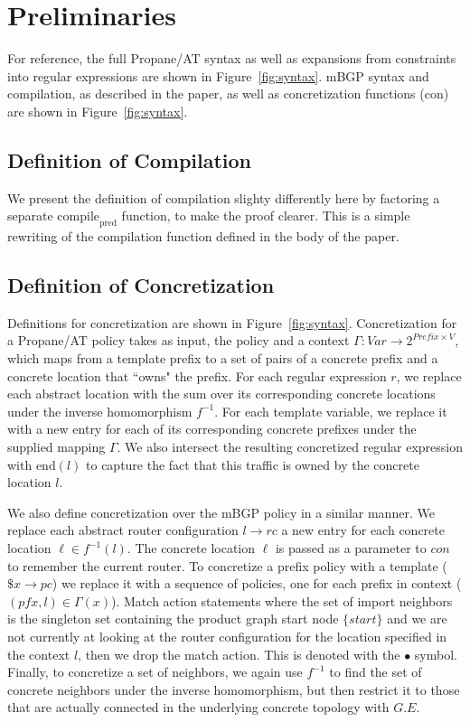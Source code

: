 \documentclass[twocolumn, openany]{sig-alternate-10pt}
\newcommand{\sysname}{{\small \sf Propane/AT}\xspace}
\newcommand{\Con}{\mathrm{con}}
\newcommand{\CompilePred}{\ensuremath{\mathrm{compile}_\mathrm{pred}}}
\begin{document}
\section{Preliminaries}

For reference, the full \sysname syntax as well as expansions from constraints into regular expressions are shown in Figure~\ref{fig:syntax}. mBGP syntax and compilation, as described in the paper, as well as concretization functions ($\Con$) are shown in Figure~\ref{fig:syntax}.

\subsection{Definition of Compilation}

We present the definition of compilation slighty differently here by factoring a separate $\CompilePred$ function, to make the proof clearer. This is a simple rewriting of the compilation function defined in the body of the paper.

\subsection{Definition of Concretization}

Definitions for concretization are shown in Figure~\ref{fig:syntax}. Concretization for a \sysname policy takes as input, the policy and a context
$\Gamma : Var \rightarrow 2^{Prefix \times V}$,
which maps from a template prefix to a set of pairs of a concrete prefix and a concrete location that ``owns" the prefix.
%
For each regular expression $r$, we replace each abstract location with the sum over its corresponding concrete locations under the inverse homomorphism $f^{-1}$. For each template variable, we replace it with a new entry for each of its corresponding concrete prefixes under the supplied mapping $\Gamma$. We also intersect the resulting concretized regular expression with $\text{end}(l)$ to capture the fact that this traffic is owned by the concrete location $l$.%

We also define concretization over the mBGP policy in a similar manner. We replace each abstract router configuration $l \rightarrow rc$ a new entry for each concrete location $\ell \in f^{-1}(l)$. The concrete location $\ell$ is passed as a parameter to $con$ to remember the current router.
%
To concretize a prefix policy with a template ($\$x \rightarrow pc$) we replace it with a sequence of policies, one for each prefix in context ($(pfx,l) \in \Gamma(x)$). Match action statements where the set of import neighbors is the singleton set containing the product graph start node $\{ start \}$ and we are not currently at looking at the router configuration for the location specified in the context $l$, then we drop the match action. This is denoted with the $\bullet$ symbol. Finally, to concretize a set of neighbors, we again use $f^{-1}$ to find the set of concrete neighbors under the inverse homomorphism, but then restrict it to those that are actually connected in the underlying concrete topology with $G.E$.
\end{document}
